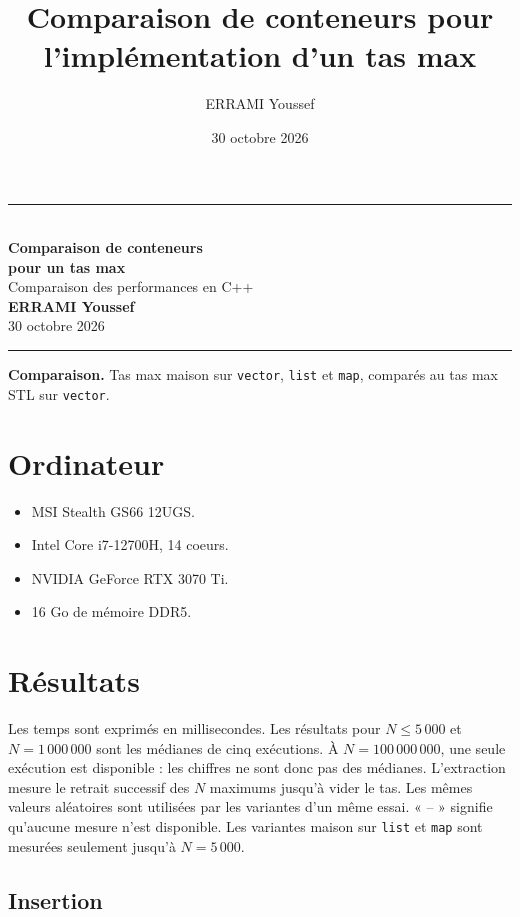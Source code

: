 \documentclass[12pt,a4paper]{article}
\title{Comparaison de conteneurs pour l'implémentation d'un tas max}
\author{ERRAMI Youssef}
\date{30 octobre 2026}
\begin{document}
\begin{center}
  {\color{bleuclair}\rule{\textwidth}{1.2pt}}\\[0.8em]
  {\Huge\bfseries\color{bleufonce}
    Comparaison de conteneurs\\[0.2em]
    pour un tas max}\\[0.6em]
  {\Large\color{bleuclair}Comparaison des performances en C++}\\[1.2em]
  {\large\bfseries ERRAMI Youssef}\\[0.3em]
  {\color{bleufonce}30 octobre 2026}\\[0.8em]
  {\color{bleuclair}\rule{\textwidth}{1.2pt}}
\end{center}
\vspace{0.8em}

\noindent
\colorbox{grisclair}{%
  \parbox{\dimexpr\textwidth-2\fboxsep\relax}{%
    \textcolor{bleufonce}{\textbf{Comparaison.}}
    Tas max maison sur \texttt{vector}, \texttt{list} et \texttt{map},
    comparés au tas max STL sur \texttt{vector}.%
  }%
}

\section{Ordinateur}
\begin{itemize}
  \item MSI Stealth GS66 12UGS.
  \item Intel Core i7-12700H, 14 coeurs.
  \item NVIDIA GeForce RTX 3070 Ti.
  \item 16 Go de mémoire DDR5.
\end{itemize}

\section{Résultats}

Les temps sont exprimés en millisecondes. Les résultats pour $N\leq 5\,000$
et $N=1\,000\,000$ sont les médianes de cinq exécutions. À
$N=100\,000\,000$, une seule exécution est disponible : les chiffres ne sont
donc pas des médianes. L'extraction mesure le retrait successif des $N$
maximums jusqu'à vider le tas. Les mêmes valeurs aléatoires sont utilisées
par les variantes d'un même essai. « -- » signifie qu'aucune mesure n'est
disponible. Les variantes maison sur \texttt{list} et \texttt{map} sont
mesurées seulement jusqu'à $N=5\,000$.

\subsection{Insertion}
\end{document}
